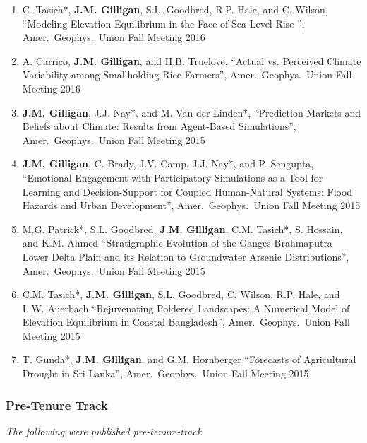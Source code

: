 \begin{enumerate}
    \item 
    C. Tasich*, \textbf{J.M. Gilligan}, S.L. Goodbred, R.P. Hale, and C. Wilson,
    \enquote{Modeling Elevation Equilibrium in the Face of Sea Level Rise },
    Amer.\ Geophys.\ Union Fall Meeting 2016

    \item 
    A. Carrico, \textbf{J.M. Gilligan}, and H.B. Truelove,
    \enquote{Actual vs. Perceived Climate Variability among Smallholding Rice Farmers},
    Amer.\ Geophys.\ Union Fall Meeting 2016

    \item \textbf{J.M. Gilligan}, J.J. Nay*, and M. Van der Linden*,
    \enquote{Prediction Markets and Beliefs about Climate: Results from Agent-Based Simulations},
    Amer.\ Geophys.\ Union Fall Meeting 2015
    
    \item \textbf{J.M. Gilligan}, C. Brady, J.V. Camp, J.J. Nay*, and P. Sengupta,
    \enquote{Emotional Engagement with Participatory Simulations as a Tool for Learning and Decision-Support for Coupled Human-Natural Systems: Flood Hazards and Urban Development},
    Amer.\ Geophys.\ Union Fall Meeting 2015
    
    \item M.G. Patrick*, S.L. Goodbred, \textbf{J.M. Gilligan}, C.M. Tasich*, S. Hossain, and K.M. Ahmed
    \enquote{Stratigraphic Evolution of the Ganges-Brahmaputra Lower Delta Plain and its Relation to Groundwater Arsenic Distributions},
    Amer.\ Geophys.\ Union Fall Meeting 2015

    \item C.M. Tasich*, \textbf{J.M. Gilligan}, S.L. Goodbred, C. Wilson, R.P. Hale, and L.W. Auerbach
    \enquote{Rejuvenating Poldered Landscapes: A Numerical Model of Elevation Equilibrium in Coastal Bangladesh},
    Amer.\ Geophys.\ Union Fall Meeting 2015

    \item T. Gunda*, \textbf{J.M. Gilligan}, and G.M. Hornberger
    \enquote{Forecasts of Agricultural Drought in Sri Lanka},
    Amer.\ Geophys.\ Union Fall Meeting 2015  
\end{enumerate}

\subsubsection{Pre-Tenure Track}
\emph{The following were published pre-tenure-track}

